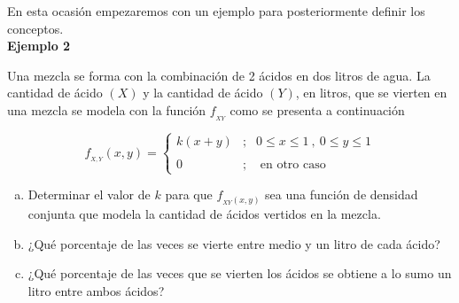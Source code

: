 \documentclass[base=hide,12pt]{elegantbook}
\begin{document}
En esta ocasión empezaremos con un ejemplo para posteriormente definir los conceptos. \\			
	
\vspace{.5cm}
\textcolor{col3}{\bf \large Ejemplo 2}

Una mezcla se forma con la combinación de 2 ácidos en dos litros de agua. La cantidad de ácido $(X)$ y la cantidad de ácido $(Y)$, en litros, que se vierten en una mezcla se modela con la función $f_{_{XY}}$ como se presenta a continuación

\vspace{.5cm}		
\begin{equation*}
	f_{_{X,Y}}(x,y)=\left\lbrace
	\begin{array}{ccl}
		k(x+y)&;& 0\leq x\leq 1\:,\:0\leq y\leq 1\\
		&&\\
		0&;& \mbox{ en otro caso}
	\end{array}
	\right.
\end{equation*}
\vspace{.5cm}			
\begin{enumerate}[(a)]
	\item Determinar el valor de $k$ para que $f_{_{XY}(x,y)}$ sea una función de densidad conjunta que modela la cantidad de ácidos vertidos en la mezcla.
	\item ¿Qué porcentaje de las veces se vierte entre medio y un litro de cada ácido?
	\item ¿Qué porcentaje de las veces que se vierten los ácidos se obtiene a lo sumo un litro entre ambos ácidos?
\end{enumerate}
\end{document}
